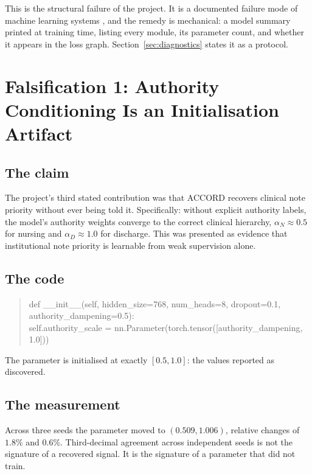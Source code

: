 This is the structural failure of the project. It is a documented failure mode
of machine learning systems \citep{sculley2015debt}, and the remedy is
mechanical: a model summary printed at training time, listing every module, its
parameter count, and whether it appears in the loss graph.
Section~\ref{sec:diagnostics} states it as a protocol.

\section{Falsification 1: Authority Conditioning Is an Initialisation Artifact}
\label{sec:c1}

\subsection{The claim}

The project's third stated contribution was that ACCORD recovers clinical note
priority without ever being told it. Specifically: without explicit authority
labels, the model's authority weights converge to the correct clinical
hierarchy, $\alpha_N \approx 0.5$ for nursing and $\alpha_D \approx 1.0$ for
discharge. This was presented as evidence that institutional note priority is
learnable from weak supervision alone.

\subsection{The code}

\begin{quote}\ttfamily\small
def \_\_init\_\_(self, hidden\_size=768, num\_heads=8, dropout=0.1,
authority\_dampening=0.5): \\
\hphantom{def }self.authority\_scale = nn.Parameter(torch.tensor([authority\_dampening, 1.0]))
\end{quote}

The parameter is initialised at exactly $[0.5, 1.0]$: the values reported as
discovered.

\subsection{The measurement}

Across three seeds the parameter moved to $(0.509, 1.006)$, relative changes of
$1.8\%$ and $0.6\%$. Third-decimal agreement across independent seeds is not the
signature of a recovered signal. It is the signature of a parameter that did not
train.

